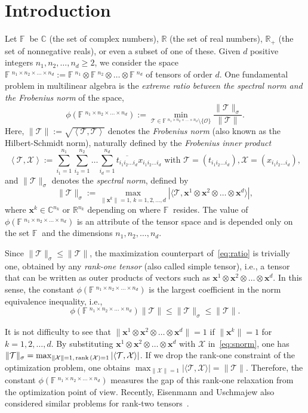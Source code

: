 \documentclass[11pt]{article}
\newcommand{\C}{\mathbb{C}}
\newcommand{\R}{\mathbb{R}}
\newcommand{\BF}{\mathbb{F}\:\!}
\newcommand{\OO}{\mathcal{O}}
\newcommand{\X}{\mathcal{X}}
\newcommand{\TT}{\mathcal{T}}
\newcommand{\bx}{\boldsymbol{x}}
\newcommand{\rank}{\textnormal{rank}\,}
\begin{document}
\section{Introduction}

Let $\BF$ be $\C$ (the set of complex numbers), $\R$ (the set of real numbers), $\R_+$ (the set of nonnegative reals), or even a subset of one of these. Given $d$ positive integers $n_1,n_2,\dots,n_d\ge2$, we consider the space $\BF^{n_1\times n_2\times \dots \times n_d}:=\BF^{n_1} \otimes \BF^{n_2} \otimes \dots \otimes\BF^{n_d}$ of tensors of order $d$. One fundamental problem in multilinear algebra is the {\em extreme ratio between the spectral norm and the Frobenius norm} of the space,
\begin{equation}\label{eq:ratio}
\phi(\BF^{n_1\times n_2\times \dots \times n_d}):=\min_{\TT\in\BF^{n_1\times n_2\times \dots \times n_d}\setminus\{\OO\}}\frac{\|\TT\|_\sigma}{\|\TT\|}.
\end{equation}
Here, $\|\TT\|:=\sqrt{\left\langle \TT,\TT\right\rangle}$ denotes the {\em Frobenius norm} (also known as the Hilbert-Schmidt norm), naturally defined by the {\em Frobenius inner product}
$$
\left\langle \TT, \X \right\rangle := \sum_{i_1=1}^{n_1} \sum_{i_2=1}^{n_2} \dots \sum_{i_d=1}^{n_d} \overline{t_{i_1i_2\dots i_d}} x_{i_1i_2\dots i_d} \mbox{ with }\TT=(t_{i_1i_2\dots i_d}), \X=(x_{i_1i_2\dots i_d}),
$$
and $\|\TT\|_\sigma$ denotes the {\em spectral norm}, defined by
\begin{equation}\label{eq:snorm}
\|\TT\|_\sigma :=\max_{\|\bx^k\|=1,\,k=1,2,\dots,d} |\langle \TT, \bx^1\otimes\bx^2\otimes \dots\otimes \bx^d \rangle|,
\end{equation}
where $\bx^k\in\C^{n_k}\mbox{ or }\R^{n_k}$ depending on where $\BF$ resides. The value of $\phi(\BF^{n_1\times n_2\times \dots \times n_d})$ is an attribute of the tensor space and is depended only on the set $\BF$ and the dimensions $n_1,n_2,\dots,n_d$.

Since $\|\TT\|_\sigma\le\|\TT\|$, the maximization counterpart of~\eqref{eq:ratio} is trivially one, obtained by any {\em rank-one tensor} (also called simple tensor), i.e., a tensor that can be written as outer products of vectors such as $\bx^1\otimes\bx^2\otimes \dots\otimes \bx^d$. In this sense, the constant $\phi(\BF^{n_1\times n_2\times \dots \times n_d})$ is the largest coefficient in the norm equivalence inequality, i.e.,
$$
\phi(\BF^{n_1\times n_2\times \dots \times n_d}) \|\TT\| \le \|\TT\|_\sigma \le \|\TT\|.
$$

It is not difficulty to see that $\|\bx^1\otimes\bx^2\otimes \dots\otimes \bx^d\|=1$ if $\|\bx^k\|=1$ for $k=1,2,\dots,d$. By substituting $\bx^1\otimes\bx^2\otimes \dots\otimes \bx^d$ with $\X$ in~\eqref{eq:snorm}, one has $\|\TT\|_\sigma=\max_{\|\X\|=1,\,\rank(\X)=1} |\langle\TT,\X\rangle|$. If we drop the rank-one constraint of the optimization problem, one obtains  $\max_{\|\X\|=1} |\langle\TT,\X\rangle|=\|\TT\|$. Therefore, the constant $\phi(\BF^{n_1\times n_2\times \dots \times n_d})$ measures the gap of this rank-one relaxation from the optimization point of view. Recently, Eisenmann and Uschmajew also considered similar problems for rank-two tensors~\cite{EU21}.
\end{document}
